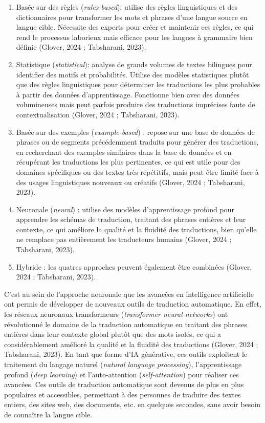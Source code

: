 \documentclass[
  letterpaper,
  DIV=11,
  numbers=noendperiod]{scrreprt}
\providecommand{\tightlist}{%
  \setlength{\itemsep}{0pt}\setlength{\parskip}{0pt}}\usepackage{longtable,booktabs,array}
\begin{document}
\begin{enumerate}
\def\labelenumi{\arabic{enumi}.}
\tightlist
\item
  Basée sur des règles (\emph{rules-based}): utilise des règles
  linguistiques et des dictionnaires pour transformer les mots et
  phrases d'une langue source en langue cible. Nécessite des experts
  pour créer et maintenir ces règles, ce qui rend le processus laborieux
  mais efficace pour les langues à grammaire bien définie (Glover, 2024
  ; Tabsharani, 2023).
\item
  Statistique (\emph{statistical}): analyse de grands volumes de textes
  bilingues pour identifier des motifs et probabilités. Utilise des
  modèles statistiques plutôt que des règles linguistiques pour
  déterminer les traductions les plus probables à partir des données
  d'apprentissage. Fonctionne bien avec des données volumineuses mais
  peut parfois produire des traductions imprécises faute de
  contextualisation (Glover, 2024 ; Tabsharani, 2023).
\item
  Basée sur des exemples (\emph{example-based}) : repose sur une base de
  données de phrases ou de segments précédemment traduits pour générer
  des traductions, en recherchant des exemples similaires dans la base
  de données et en récupérant les traductions les plus pertinentes, ce
  qui est utile pour des domaines spécifiques ou des textes très
  répétitifs, mais peut être limité face à des usages linguistiques
  nouveaux ou créatifs (Glover, 2024 ; Tabsharani, 2023).
\item
  Neuronale (\emph{neural}) : utilise des modèles d'apprentissage
  profond pour apprendre les schémas de traduction, traitant des phrases
  entières et leur contexte, ce qui améliore la qualité et la fluidité
  des traductions, bien qu'elle ne remplace pas entièrement les
  traducteurs humains (Glover, 2024 ; Tabsharani, 2023).
\item
  Hybride : les quatres approches peuvent également être combinées
  (Glover, 2024 ; Tabsharani, 2023).
\end{enumerate}

C'est au sein de l'approche neuronale que les avancées en intelligence
artificielle ont permis de développer de nouveaux outils de traduction
automatique. En effet, les réseaux neuronaux transformeurs
(\emph{transformer neural networks}) ont révolutionné le domaine de la
traduction automatique en traitant des phrases entières dans leur
contexte global plutôt que des mots isolés, ce qui a considérablement
amélioré la qualité et la fluidité des traductions (Glover, 2024 ;
Tabsharani, 2023). En tant que forme d'IA générative, ces outils
exploitent le traitement du langage naturel (\emph{natural language
processing}), l'apprentissage profond (\emph{deep learning}) et
l'auto-attention (\emph{self-attention}) pour réaliser ces avancées. Ces
outils de traduction automatique sont devenus de plus en plus populaires
et accessibles, permettant à des personnes de traduire des textes
entiers, des sites web, des documents, etc. en quelques secondes, sans
avoir besoin de connaître la langue cible.
\end{document}
